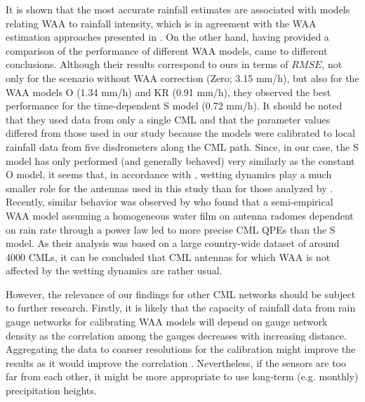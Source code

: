\documentclass{ctuthesis}\usepackage[]{graphicx}\usepackage[]{color}
\begin{document}
It is shown that the most accurate rainfall estimates are associated with models relating WAA to rainfall intensity, which is in agreement with the WAA estimation approaches presented in \cite{valtrExcessAttenuationCaused2019, kharadlyEffectWetAntenna2001, leijnseMicrowaveLinkRainfall2008, fenclQuantifyingWetAntenna2019}. On the other hand, having provided a comparison of the performance of different WAA models, \cite{schleissQuantificationModelingWetAntenna2013} came to different conclusions. Although their results correspond to ours in terms of $R\!M\!S\!E$, not only for the scenario without WAA correction (Zero; 3.15 mm/h), but also for the WAA models O (1.34 mm/h) and KR (0.91 mm/h), they observed the best performance for the time-dependent S model (0.72 mm/h). It should be noted that they used data from only a single CML and that the parameter values differed from those used in our study because the models were calibrated to local rainfall data from five disdrometers along the CML path. Since, in our case, the S model has only performed (and generally behaved) very similarly as the constant O model, it seems that, in accordance with \cite{lethMeasurementCampaignAssess2018}, wetting dynamics play a much smaller role for the antennas used in this study than for those analyzed by \cite{schleissQuantificationModelingWetAntenna2013}. Recently, similar behavior was observed by \cite{grafRainfallEstimationGermanwide2020} who found that a semi-empirical WAA model assuming a homogeneous water film on antenna radomes dependent on rain rate through a power law \citep{leijnseMicrowaveLinkRainfall2008} led to more precise CML QPEs than the S model. As their analysis was based on a large country-wide dataset of around 4000 CMLs, it can be concluded that CML antennas for which WAA is not affected by the wetting dynamics are rather usual.

However, the relevance of our findings for other CML networks should be subject to further research. Firstly, it is likely that the capacity of rainfall data from rain gauge networks for calibrating WAA models will depend on gauge network density as the correlation among the gauges decreases with increasing distance. Aggregating the data to coarser resolutions for the calibration might improve the results as it would improve the correlation \citep{villariniRainfallSamplingUncertainties2008}. Nevertheless, if the sensors are too far from each other, it might be more appropriate to use long-term (e.g. monthly) precipitation heights. 
\end{document}
